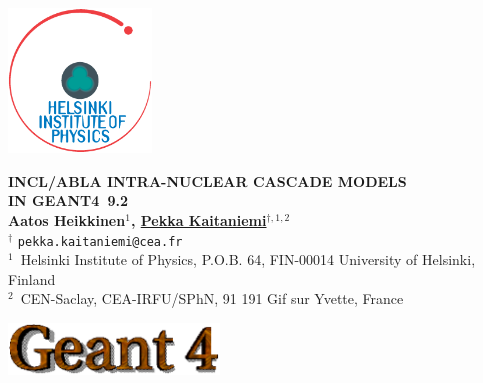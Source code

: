 \documentclass[20pt]{article}
\newlength{\bgwidth}
\newlength{\bgheight}
\begin{document}
\huge
\begin{center}



\vspace{-2.0cm}
	\parbox[c]{1.4cm}{\includegraphics[width=3.8cm]{images/hiplogo.eps}}
	\hspace{0.6cm}
   \parbox[c]{0.8\linewidth}{
		\begin{center}

			\textbf{\Huge INCL/ABLA INTRA-NUCLEAR CASCADE MODELS \\ IN {\sf GEANT4~9.2}} \\[0.5em]
			\textbf{\LARGE Aatos Heikkinen$^{1}$, \underline{Pekka Kaitaniemi}$^{\dagger, 1, 2}$} \\[0.3em]
			{\Large $^{\dagger}$ {\tt pekka.kaitaniemi@cea.fr}} \\
                        {\LARGE $^1$~Helsinki Institute of Physics, P.O.B. 64, FIN-00014 University of Helsinki, Finland}\\
                        {\LARGE $^2$~CEN-Saclay, CEA-IRFU/SPhN, 91 191 Gif sur Yvette, France}
                        \vskip2cm
		\end{center}
	}
	\parbox[c]{5.3cm}{\hspace{-1.0cm} \includegraphics[width=5.6cm]{images/g4logo.eps}}


\end{center}
\end{document}
